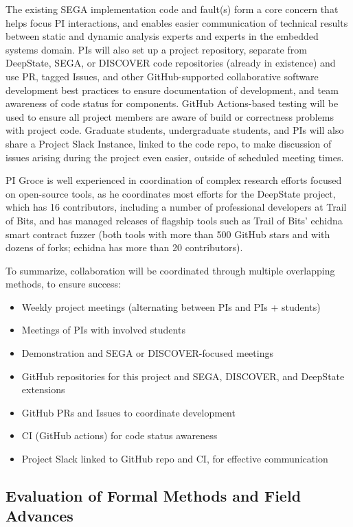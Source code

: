 \documentclass[12pt]{article}
\begin{document}
The existing SEGA implementation code and fault(s) form a core concern that helps focus PI interactions, and enables easier communication of technical results between static and dynamic analysis experts and experts in the embedded systems domain.  PIs will also set up a project repository, separate from DeepState, SEGA, or DISCOVER code repositories (already in existence) and use PR, tagged Issues, and other GitHub-supported collaborative software development best practices to ensure documentation of development, and team awareness of code status for components.  GitHub Actions-based testing will be used to ensure all project members are aware of build or correctness problems with project code.  Graduate students, undergraduate students, and PIs will also share a Project Slack Instance, linked to the code repo, to make discussion of issues arising during the project even easier, outside of scheduled meeting times.

PI Groce is well experienced in coordination of complex research efforts focused on open-source tools, as he coordinates most efforts for the DeepState project, which has 16 contributors, including a number of professional developers at Trail of Bits, and has managed releases of flagship tools such as Trail of Bits' echidna smart contract fuzzer (both tools with more than 500 GitHub stars and with dozens of forks; echidna has more than 20 contributors).

To summarize, collaboration will be coordinated through multiple overlapping methods, to ensure success:
\begin{itemize}
\item Weekly project meetings (alternating between PIs and PIs + students)
\item Meetings of PIs with involved students
\item Demonstration and SEGA or DISCOVER-focused meetings
\item GitHub repositories for this project and SEGA, DISCOVER, and DeepState extensions
\item GitHub PRs and Issues to coordinate development
\item CI (GitHub actions) for code status awareness
\item Project Slack linked to GitHub repo and CI, for effective communication
\end{itemize}

\subsection{Evaluation of Formal Methods and Field Advances}
\end{document}
